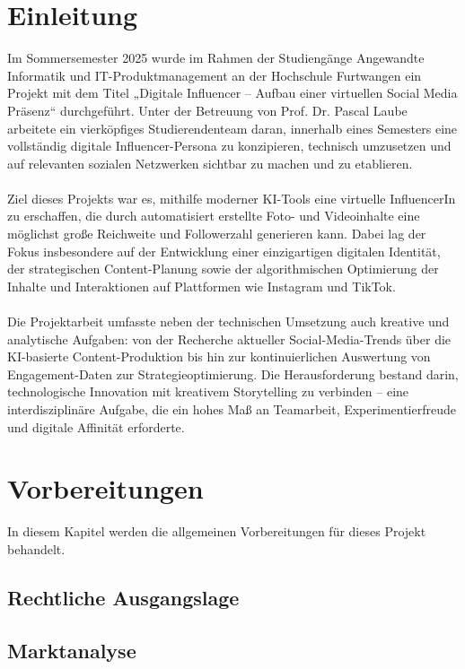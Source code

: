 \documentclass[a4paper,12pt]{article}
\begin{document}
\section{Einleitung}
Im Sommersemester 2025 wurde im Rahmen der Studiengänge Angewandte Informatik und IT-Produktmanagement an der Hochschule Furtwangen ein Projekt mit dem Titel „Digitale Influencer – Aufbau einer virtuellen Social Media Präsenz“ durchgeführt. Unter der Betreuung von Prof. Dr. Pascal Laube arbeitete ein vierköpfiges Studierendenteam daran, innerhalb eines Semesters eine vollständig digitale Influencer-Persona zu konzipieren, technisch umzusetzen und auf relevanten sozialen Netzwerken sichtbar zu machen und zu etablieren. \\\\
Ziel dieses Projekts war es, mithilfe moderner KI-Tools eine virtuelle InfluencerIn zu erschaffen, die durch automatisiert erstellte Foto- und Videoinhalte eine möglichst große Reichweite und Followerzahl generieren kann. Dabei lag der Fokus insbesondere auf der Entwicklung einer einzigartigen digitalen Identität, der strategischen Content-Planung sowie der algorithmischen Optimierung der Inhalte und Interaktionen auf Plattformen wie Instagram und TikTok.\\\\
Die Projektarbeit umfasste neben der technischen Umsetzung auch kreative und analytische Aufgaben: von der Recherche aktueller Social-Media-Trends über die KI-basierte Content-Produktion bis hin zur kontinuierlichen Auswertung von \\ Engagement-Daten zur Strategieoptimierung. Die Herausforderung bestand darin, technologische Innovation mit kreativem Storytelling zu verbinden – eine interdisziplinäre Aufgabe, die ein hohes Maß an Teamarbeit, Experimentierfreude und digitale Affinität erforderte.

\newpage

\section{Vorbereitungen}

In diesem Kapitel werden die allgemeinen Vorbereitungen für dieses Projekt behandelt. 

\subsection{Rechtliche Ausgangslage}

\subsection{Marktanalyse}
\end{document}
